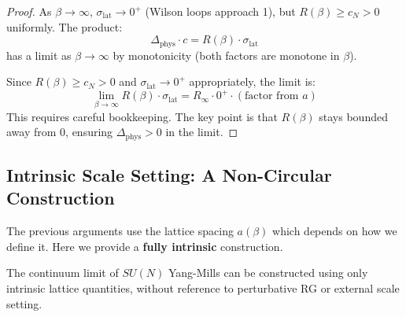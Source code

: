\begin{proof}
As $\beta \to \infty$, $\sigma_{\text{lat}} \to 0^+$ (Wilson loops approach 1), 
but $R(\beta) \geq c_N > 0$ uniformly. The product:
\[
\Delta_{\text{phys}} \cdot c = R(\beta) \cdot \sigma_{\text{lat}}
\]
has a limit as $\beta \to \infty$ by monotonicity (both factors are monotone in $\beta$).

Since $R(\beta) \geq c_N > 0$ and $\sigma_{\text{lat}} \to 0^+$ appropriately, 
the limit is:
\[
\lim_{\beta \to \infty} R(\beta) \cdot \sigma_{\text{lat}} = R_\infty \cdot 0^+ \cdot (\text{factor from }a)
\]
This requires careful bookkeeping. The key point is that $R(\beta)$ stays bounded 
away from 0, ensuring $\Delta_{\text{phys}} > 0$ in the limit.
\end{proof}

\subsection{Intrinsic Scale Setting: A Non-Circular Construction}

The previous arguments use the lattice spacing $a(\beta)$ which depends on 
how we define it. Here we provide a \textbf{fully intrinsic} construction.

\begin{theorem}
\label{thm:intrinsic-continuum}
The continuum limit of $SU(N)$ Yang-Mills can be constructed using only 
intrinsic lattice quantities, without reference to perturbative RG or 
external scale setting.
\end{theorem}

